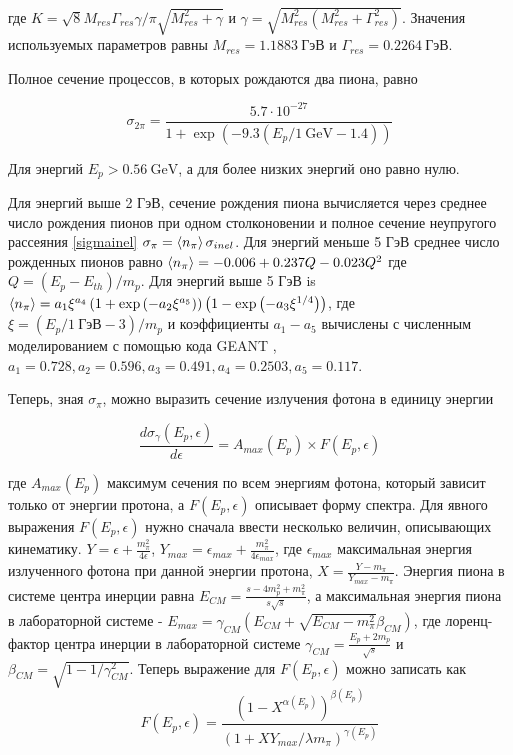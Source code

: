 где $K = \sqrt{8}M_{res}\Gamma_{res}\gamma/\pi\sqrt{M_{res}^2+\gamma}$ и $\gamma = \sqrt{M_{res}^2\left(M_{res}^2+\Gamma_{res}^2\right)}$. Значения используемых параметров равны $M_{res} = 1.1883~\text{ГэВ}$ и $\Gamma_{res} = 0.2264~\text{ГэВ}$.

Полное сечение процессов, в которых рождаются два пиона, равно

\begin{equation}
	\sigma_{2\pi}=\frac{5.7\cdot10^{-27}}{1+\exp(-9.3\left(E_p/1~\text{GeV} - 1.4\right))}
\end{equation}

Для энергий $E_p > 0.56~\text{GeV}$, а для более низких энергий оно равно нулю.

Для энергий выше 2 ГэВ, сечение рождения пиона вычисляется через среднее число рождения пионов при одном столконовении и полное сечение неупругого рассеяния \ref{sigmainel} $\sigma_{\pi} = \braket{n_{\pi}} \sigma_{inel}$. Для энергий меньше 5 ГэВ среднее число рожденных пионов равно $\braket{n_{\pi}} = -0.006 + 0.237 Q - 0.023 Q^2$ где $Q = \left(E_p - E_{th}\right)/m_p$. Для энергий выше 5 ГэВ is $\braket{n_{\pi}} = a_1 \xi^{a_4}\left(1 + \exp\left(-a_2\xi^{a_5}\right)\right)\left(1-\exp\left(-a_3\xi^{1/4}\right)\right)$, где $\xi = \left(E_p/1~\text{ГэВ} - 3\right)/m_p$ и коэффициенты $a_1-a_5$ вычислены с численным моделированием с помощью кода GEANT \cite{AllisonGeant2006}, $a_1 = 0.728, a_2 = 0.596, a_3 = 0.491, a_4 = 0.2503, a_5 = 0.117$.

Теперь, зная $\sigma_{\pi}$, можно выразить сечение излучения фотона в единицу энергии

\begin{equation}
	\frac{d\sigma_{\gamma}\left(E_p, \epsilon\right)}{d\epsilon} = A_{max}\left(E_p\right)\times F\left(E_p, \epsilon\right)
\end{equation}

где $A_{max}(E_p)$ максимум сечения по всем энергиям фотона, который зависит только от энергии протона, а $F\left(E_p,\epsilon\right)$ описывает форму спектра. Для явного выражения $F\left(E_p, \epsilon\right)$ нужно сначала ввести несколько величин, описывающих кинематику. $Y=\epsilon+\frac{m_{\pi}^2}{4 \epsilon}$, $Y_{max}=\epsilon_{max}+\frac{m_{\pi}^2}{4 \epsilon_{max}}$, где $\epsilon_{max}$ максимальная энергия излученного фотона при данной энергии протона, $X=\frac{Y-m_{\pi}}{Y_{max}-m_{\pi}}$. Энергия пиона в системе центра инерции равна $E_{CM}=\frac{s-4m_p^2+m_{\pi}^2}{s\sqrt{s}}$, а максимальная энергия пиона в лабораторной системе -  $E_{max}=\gamma_{CM}\left(E_{CM}+\sqrt{E_{CM}-m_{\pi}^2}\beta_{CM}\right)$, где лоренц-фактор центра инерции в лабораторной системе $\gamma_{CM}=\frac{E_p+2m_p}{\sqrt{s}}$ и $\beta_{CM}=\sqrt{1-1/\gamma_{CM}^2}$. Теперь выражение для $F\left(E_p,\epsilon\right)$ можно записать как
\begin{equation}
	F\left(E_p,\epsilon\right) = \frac{\left(1-X^{\alpha(E_p)}\right)^{\beta(E_p)}}{\left(1+X Y_{max}/\lambda m_{\pi}\right)^{\gamma(E_p)}}
\end{equation}

